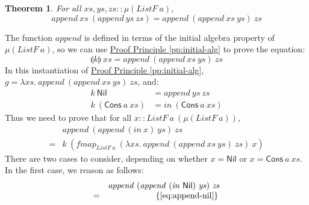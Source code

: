 \documentclass{jfp1}
\newcommand{\fold}[1]{\llparenthesis #1 \rrparenthesis}
\newcommand{\eqAnnotation}[1]{\hspace{2cm}\left\{\textrm{#1}\right\}}
\newtheorem{theorem}{Theorem}
\newcommand{\proofprinref}[1]{\hyperref[#1]{Proof Principle \ref*{#1}}}
\begin{document}
\begin{theorem}\label{thm:append-assoc}
  For all $\mathit{xs}, \mathit{ys}, \mathit{zs} :: \mu(\mathit{ListF}~a)$,
  \begin{displaymath}
    \mathit{append}~\mathit{xs}~(\mathit{append}~\mathit{ys}~\mathit{zs}) = \mathit{append}~(\mathit{append}~\mathit{xs}~\mathit{ys})~\mathit{zs}
  \end{displaymath}
\end{theorem}

\begin{proof*}
  The function $\mathit{append}$ is defined in terms of the initial
  algebra property of $\mu(\mathit{ListF}~a)$, so we can use
  \proofprinref{pp:initial-alg} to prove the equation:
  \begin{displaymath}
    \fold{k}~\mathit{xs} = \mathit{append}~(\mathit{append}~\mathit{xs}~\mathit{ys})~\mathit{zs}
  \end{displaymath}
  In this instantiation of \proofprinref{pp:initial-alg}, $g = \lambda
  \mathit{xs}.~\mathit{append}~(\mathit{append}~\mathit{xs}~\mathit{ys})~\mathit{zs}$,
  and:
  \begin{align}
    \label{eq:append-fAlgebra-nil}
    k~\mathsf{Nil} &= \mathit{append}~\mathit{ys}~\mathit{zs} \\
    \label{eq:append-fAlgebra-cons}
    k~(\mathsf{Cons}~a~\mathit{xs}) &= \mathit{in}~(\mathsf{Cons}~a~\mathit{xs})
  \end{align}
  Thus we need to prove that for all $x ::
  \mathit{ListF}~a~(\mu(\mathit{ListF}~a))$,
  \begin{displaymath}
    \begin{array}{cl}
      &\mathit{append}~(\mathit{append}~(\mathit{in}~x)~\mathit{ys})~\mathit{zs}\\
      =&k~(\mathit{fmap}_{\mathit{ListF}~a}~(\lambda \mathit{xs}.~\mathit{append}~(\mathit{append}~\mathit{xs}~\mathit{ys})~\mathit{zs})~x)
    \end{array}
  \end{displaymath}
  There are two cases to consider, depending on whether $x =
  \mathsf{Nil}$ or $x = \mathsf{Cons}~a~\mathit{xs}$. In the first
  case, we reason as follows:
  \begin{displaymath}
    \begin{array}{cl}
      & \mathit{append}~(\mathit{append}~(\mathit{in}~\mathsf{Nil})~\mathit{ys})~\mathit{zs}\\
      =&\eqAnnotation{\autoref{eq:append-nil}} \\

\end{array}
\end{displaymath}
\end{proof*}
\end{document}
